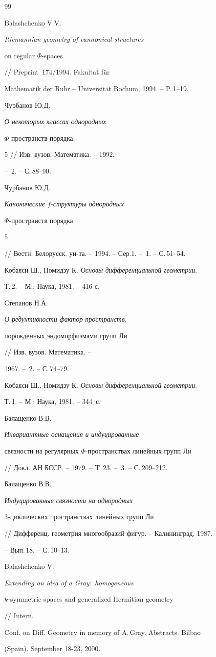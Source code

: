 \begin{thebibliography}{99}


Balashchenko V.V. {\em Riemannian geometry of cannonical structures


on regular $\Phi$-spaces} // Preprint \No\,174/1994. Fakultat f\"ur


Mathematik der Ruhr -- Universitat Bochum, 1994. -- P.\,1--19.




Чурбанов Ю.Д. {\em О некоторых классах однородных


$\Phi$-пространств порядка} 5 // Изв. вузов. Математика. -- 1992.


-- \No\,2. -- С.\,88--90.




Чурбанов Ю.Д. {\em Канонические $f$-структуры однородных


$\Phi$-пространств порядка} 5


// Вестн. Белорусск. ун-та. -- 1994. -- Сер.1. -- \No\,1. -- С.\,51--54.




Кобаяси Ш., Номидзу К. {\em Основы дифференциальной геометрии}.


Т.\,2. -- М.: Наука, 1981. -- 416 с.




Степанов Н.А. {\em О редуктивности фактор-пространств,


порожденных эндоморфизмами групп Ли} // Изв. вузов. Математика. --


1967. -- \No\,2. -- С.\,74--79.




Кобаяси Ш., Номидзу К. {\em Основы дифференциальной геометрии}.


Т.\,1. -- М.: Наука, 1981. -- 344~с.




Балащенко В.В. {\em Инвариантные оснащения и индуцированные


связности на регулярных $\Phi$-пространствах линейных групп Ли}


// Докл. АН БССР. -- 1979. -- T.\,23. -- \No\,3. -- С.\,209--212.




Балащенко В.В. {\em Индуцированные связности на однородных


$3$-циклических пространствах линейных групп Ли}


// Дифференц. геометрия многообразий фигур. -- Калининград, 1987.


-- Вып.\,18. -- С.\,10--13.




Balashchenko V. {\em Extending an idea of a Gray$:$ homogeneous


$k$-symmetric spaces and generalized Hermitian geometry} // Intern.


Conf. on Diff. Geometry in memory of A.\,Gray. Abstracts. Bilbao


(Spain). September 18-23, 2000.





\end{thebibliography}
